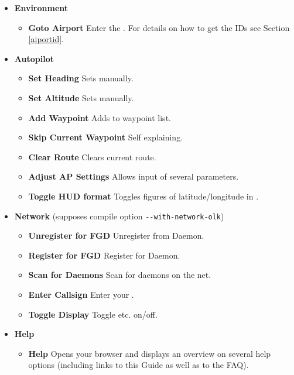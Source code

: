 \begin{itemize}
\item \textbf{Environment}
 \begin{itemize}
 \item \textbf{Goto Airport} Enter the . For details on how to get the IDs
  see Section \ref{aiportid}.
 \end{itemize}

 \item \textbf{Autopilot}
 \begin{itemize}
 \item \textbf{Set Heading} Sets  manually.
 \item \textbf{Set Altitude} Sets  manually.
 \item \textbf{Add Waypoint} Adds  to waypoint list.
 \item \textbf{Skip Current Waypoint} Self explaining.
 \item \textbf{Clear Route} Clears current route.
 \item \textbf{Adjust AP Settings} Allows input of several  parameters.
 \item \textbf{Toggle HUD format} Toggles figures of latitude/longitude in .
 \end{itemize}
 
 \item\textbf{Network} (supposes compile option \texttt{-$ $-with-network-olk})
 \begin{itemize}
 \item \textbf{Unregister for FGD} Unregister from \FlightGear{} Daemon.
 \item \textbf{Register for FGD} Register for \FlightGear{} Daemon.
 \item \textbf{Scan for Daemons} Scan for daemons on the net.
 \item \textbf{Enter Callsign} Enter your . 
 \item \textbf{Toggle Display} Toggle  etc. on/off. 
 
 \end{itemize}

 \item \textbf{Help}
 \begin{itemize}
 \item \textbf{Help} Opens your browser and displays an overview on several help options (including links to this Guide as well as to the FAQ). 
 \end{itemize}
\end{itemize}

